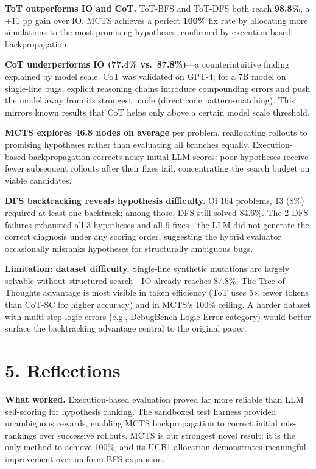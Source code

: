 \documentclass[11pt,letterpaper]{article}
\begin{document}
\textbf{ToT outperforms IO and CoT.}
ToT-BFS and ToT-DFS both reach \textbf{98.8\%}, a +11 pp gain over IO.
MCTS achieves a perfect \textbf{100\%} fix rate by allocating more simulations to
the most promising hypotheses, confirmed by execution-based backpropagation.

\textbf{CoT underperforms IO (77.4\% vs.\ 87.8\%)}---a counterintuitive finding explained by
model scale. CoT was validated on GPT-4; for a 7B model on single-line bugs,
explicit reasoning chains introduce compounding errors and push the model away from its
strongest mode (direct code pattern-matching). This mirrors known results that CoT helps only
above a certain model scale threshold.

\textbf{MCTS explores 46.8 nodes on average} per problem, reallocating rollouts to promising
hypotheses rather than evaluating all branches equally. Execution-based backpropagation
corrects noisy initial LLM scores: poor hypotheses receive fewer subsequent rollouts after their
fixes fail, concentrating the search budget on viable candidates.

\textbf{DFS backtracking reveals hypothesis difficulty.}
Of 164 problems, 13 (8\%) required at least one backtrack; among those, DFS still solved
84.6\%. The 2 DFS failures exhausted all 3 hypotheses and all 9 fixes---the LLM did not
generate the correct diagnosis under any scoring order, suggesting the hybrid evaluator
occasionally misranks hypotheses for structurally ambiguous bugs.

\textbf{Limitation: dataset difficulty.}
Single-line synthetic mutations are largely solvable without structured search---IO already
reaches 87.8\%. The Tree of Thoughts advantage is most visible in token efficiency
(ToT uses 5$\times$ fewer tokens than CoT-SC for higher accuracy) and in MCTS's 100\%
ceiling. A harder dataset with multi-step logic errors (e.g., DebugBench Logic Error category)
would better surface the backtracking advantage central to the original paper.

\section*{5. Reflections}

\textbf{What worked.} Execution-based evaluation proved far more reliable than LLM
self-scoring for hypothesis ranking. The sandboxed test harness provided unambiguous rewards,
enabling MCTS backpropagation to correct initial mis-rankings over successive rollouts.
MCTS is our strongest novel result: it is the only method to achieve 100\%, and its UCB1
allocation demonstrates meaningful improvement over uniform BFS expansion.
\end{document}
